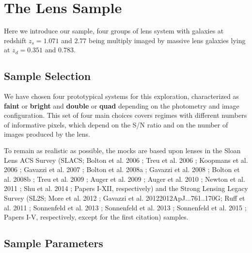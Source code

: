 \documentclass[a4paper,11pt]{article}
\begin{document}
\section{The Lens Sample}

Here we introduce our sample, four groups of lens system with galaxies at redshift $z_s = 1.071$ and $2.77$ being multiply imaged by massive lens galaxies lying at $z_d = 0.351$ and $0.783$.

\subsection{Sample Selection}

We have chosen four prototypical systems for this exploration, characterized as \textbf{faint} or \textbf{bright} and \textbf{double} or \textbf{quad} depending on the photometry and image configuration. This set of four main choices covers regimes with different numbers of informative pixels, which depend on the S/N ratio and on the number of images produced by the lens.

To remain as realistic as possible, the mocks are based upon lenses in the Sloan Lens ACS Survey (SLACS; Bolton et al. 2006 \cite{2006ApJ...638..703B}; Treu et al. 2006 \cite{2006ApJ...640..662T}; Koopmans et al. 2006 \cite{2006ApJ...649..599K}; Gavazzi et al. 2007 \cite{2007ApJ...667..176G}; Bolton et al. 2008a \cite{2008ApJ...682..964B}; Gavazzi et al. 2008 \cite{2008ApJ...677.1046G}; Bolton et al. 2008b \cite{2008ApJ...684..248B}; Treu et al. 2009 \cite{2009ApJ...690..670T}; Auger et al. 2009 \cite{2009ApJ...705.1099A}; Auger et al. 2010 \cite{2010ApJ...724..511A}; Newton et al. 2011 \cite{2011ApJ...734..104N}; Shu et al. 2014 \cite{2014arXiv1407.2240S}; Papers I-XII, respectively) and the Strong Lensing Legacy Survey (SL2S; More et al. 2012 \cite{2012ApJ...749...38M}; Gavazzi et al. 2012{2012ApJ...761..170G}; Ruff et al. 2011 \cite{2011ApJ...727...96R}; Sonnenfeld et al. 2013 \cite{2013ApJ...777...97S}; Sonnenfeld et al. 2013 \cite{2013ApJ...777...98S}; Sonnenfeld et al. 2015 \cite{2015ApJ...800...94S}; Papers I-V, respectively, except for the first citation) samples. 

\subsection{Sample Parameters}
\end{document}
